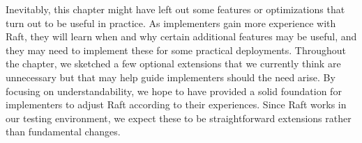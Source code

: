 Inevitably, this chapter might have left out some features or
optimizations that turn out to be useful in practice. As implementers
gain more experience with Raft, they will learn when and why certain
additional features may be useful, and they may need to implement these
for some practical deployments. Throughout the chapter, we sketched a
few optional extensions that we currently think are unnecessary but that
may help guide implementers should the need arise. By focusing on
understandability, we hope to have provided a solid foundation for
implementers to adjust Raft according to their experiences. Since Raft
works in our testing environment, we expect these to be straightforward
extensions rather than fundamental changes.
